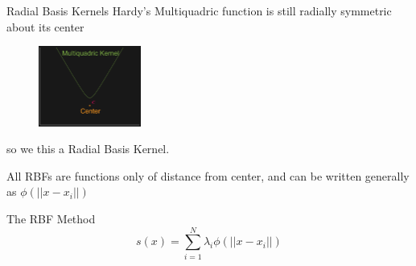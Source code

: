 \documentclass[12pt,t]{beamer}
\newcommand{\subt}[1]{{\footnotesize \color{subtitle} {#1}}}
\begin{document}
\begin{frame}{Radial Basis Kernels}
Hardy's Multiquadric function is still \subt{radially symmetric} about its center


\begin{figure}
\includegraphics[width=0.3\textwidth, keepaspectratio]{fig7.png}
\end{figure}
so we this a Radial Basis Kernel. 

All RBFs are functions only of distance from center, and can be written generally as $\phi(||x-x_i||)$

\subt{The RBF Method}
\begin{equation*}
s(x)=\sum_{i=1}^N \lambda_i \phi(||x-x_i||)
\end{equation*}

\note{}
\end{frame}
\end{document}
